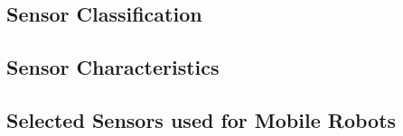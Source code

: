 \subsection{Sensor Classification}
\subsection{Sensor Characteristics}
\subsection{Selected Sensors used for Mobile Robots}